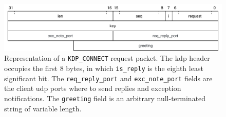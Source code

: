 \begin{figure}
    \centering
    \caption{Representation of a \lstinline{KDP_CONNECT} request packet. The \gls{kdp} header occupies the first 8 bytes, in which \lstinline{is_reply} is the eighth least significant bit. The \lstinline{req_reply_port} and \lstinline{exc_note_port} fields are the client \gls{udp} ports where to send replies and exception notifications. The \lstinline{greeting} field is an arbitrary null-terminated string of variable length.}\label{fig:kdpconnect}
    \includegraphics[width=\textwidth]{figures/kdpconnect.pdf}
\end{figure}

